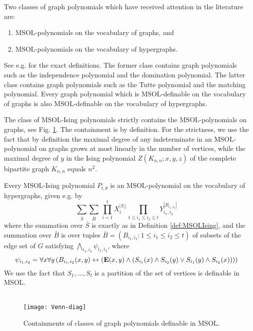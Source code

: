 \documentclass{llncs}
\newcommand{\MSOL}{\mathrm{MSOL}}
\begin{document}
Two classes of graph polynomials which have received attention in the literature are:
\begin{enumerate}
 \item $\MSOL$-polynomials on the vocabulary of graphs, and
 \item $\MSOL$-polynomials on the vocabulary of hypergraphs. 
\end{enumerate}
See e.g. \cite{ar:KM14connection} for the exact definitions. The former class contains graph polynomials such as the independence polynomial
and the domination polynomial. The latter class contains graph polynomials such as the Tutte polynomial and the matching polynomial. 
Every graph polynomial which is $\MSOL$-definable on the vocabulary of graphs is also $\MSOL$-definable on the vocabulary of hypergraphs. 

The class of $\MSOL$-Ising polynomials strictly contains the $\MSOL$-polynomials on graphs, see Fig. \ref{fig}. The containment is by definition. 
For the strictness, we use the fact that by definition the maximal degree of any indeterminate in an $\MSOL$-polynomial on graphs grows at most linearly in the number of vertices, while 
the maximal degree of $y$ in the Ising polynomial $Z(K_{n,n};x,y,z)$
of the complete bipartite graph $K_{n,n}$ equals $n^2$.

Every $\MSOL$-Ising polynomial $P_{t,\theta}$ is an $\MSOL$-polynomial on the
vocabulary of hypergraphs, given e.g. by 
\[
\sum_{\bar{S}}\sum_{\bar{B}}\,\prod_{i=1}^{t}X_{i}^{|S_{i}|}\prod_{1\leq i_{1}\leq i_{2}\leq t}Y_{i_{1},i_{2}}^{|B_{i_{1},i_{2}}|}
\]
where the summation over $\bar{S}$ is exactly as in Definition \ref{def:MSOLIsing},
and the summation over $\bar{B}$ is over tuples $\bar{B}=(B_{i_{1},i_{2}}:1\leq i_{1}\leq i_{2}\leq t)$
of subsets of the edge set of $G$ satisfying $\bigwedge_{i_{1},i_{2}}\psi_{i_{1},i_{2}}$,
where 
\[
\psi_{i_{1},i_{2}}=\forall x\forall y\left(B_{i_1,i_2}(x,y)\leftrightarrow \left({\bf E}(x,y)\land (S_{i_{1}}(x)\land S_{i_{2}}(y)\lor S_{i_{1}}(y)\land S_{i_{2}}(x))\right)\right)
\]
We use the fact that $S_1,\ldots,S_t$ is a partition of the set of vertices is definable in $\MSOL$.  

\begin{figure}
  \caption{\label{fig} Containments of classes of graph polynomials definable in $\MSOL$. }
  \ \\
  \centering
    \texttt{[image: Venn-diag]}
\end{figure}
\end{document}

